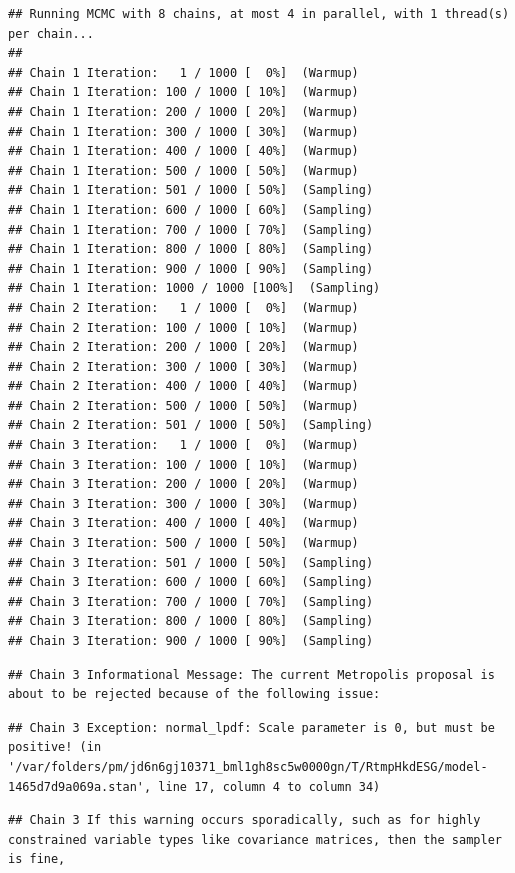 \documentclass[
]{article}
\begin{document}
\begin{verbatim}
## Running MCMC with 8 chains, at most 4 in parallel, with 1 thread(s) per chain...
## 
## Chain 1 Iteration:   1 / 1000 [  0%]  (Warmup) 
## Chain 1 Iteration: 100 / 1000 [ 10%]  (Warmup) 
## Chain 1 Iteration: 200 / 1000 [ 20%]  (Warmup) 
## Chain 1 Iteration: 300 / 1000 [ 30%]  (Warmup) 
## Chain 1 Iteration: 400 / 1000 [ 40%]  (Warmup) 
## Chain 1 Iteration: 500 / 1000 [ 50%]  (Warmup) 
## Chain 1 Iteration: 501 / 1000 [ 50%]  (Sampling) 
## Chain 1 Iteration: 600 / 1000 [ 60%]  (Sampling) 
## Chain 1 Iteration: 700 / 1000 [ 70%]  (Sampling) 
## Chain 1 Iteration: 800 / 1000 [ 80%]  (Sampling) 
## Chain 1 Iteration: 900 / 1000 [ 90%]  (Sampling) 
## Chain 1 Iteration: 1000 / 1000 [100%]  (Sampling) 
## Chain 2 Iteration:   1 / 1000 [  0%]  (Warmup) 
## Chain 2 Iteration: 100 / 1000 [ 10%]  (Warmup) 
## Chain 2 Iteration: 200 / 1000 [ 20%]  (Warmup) 
## Chain 2 Iteration: 300 / 1000 [ 30%]  (Warmup) 
## Chain 2 Iteration: 400 / 1000 [ 40%]  (Warmup) 
## Chain 2 Iteration: 500 / 1000 [ 50%]  (Warmup) 
## Chain 2 Iteration: 501 / 1000 [ 50%]  (Sampling) 
## Chain 3 Iteration:   1 / 1000 [  0%]  (Warmup) 
## Chain 3 Iteration: 100 / 1000 [ 10%]  (Warmup) 
## Chain 3 Iteration: 200 / 1000 [ 20%]  (Warmup) 
## Chain 3 Iteration: 300 / 1000 [ 30%]  (Warmup) 
## Chain 3 Iteration: 400 / 1000 [ 40%]  (Warmup) 
## Chain 3 Iteration: 500 / 1000 [ 50%]  (Warmup) 
## Chain 3 Iteration: 501 / 1000 [ 50%]  (Sampling) 
## Chain 3 Iteration: 600 / 1000 [ 60%]  (Sampling) 
## Chain 3 Iteration: 700 / 1000 [ 70%]  (Sampling) 
## Chain 3 Iteration: 800 / 1000 [ 80%]  (Sampling) 
## Chain 3 Iteration: 900 / 1000 [ 90%]  (Sampling)
\end{verbatim}

\begin{verbatim}
## Chain 3 Informational Message: The current Metropolis proposal is about to be rejected because of the following issue:
\end{verbatim}

\begin{verbatim}
## Chain 3 Exception: normal_lpdf: Scale parameter is 0, but must be positive! (in '/var/folders/pm/jd6n6gj10371_bml1gh8sc5w0000gn/T/RtmpHkdESG/model-1465d7d9a069a.stan', line 17, column 4 to column 34)
\end{verbatim}

\begin{verbatim}
## Chain 3 If this warning occurs sporadically, such as for highly constrained variable types like covariance matrices, then the sampler is fine,
\end{verbatim}
\end{document}
